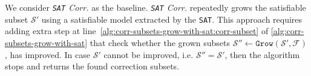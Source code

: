 \documentclass[a4paper,UKenglish,cleveref, autoref, thm-restate, pdfa]{lipics-v2021}
\newcommand\m[1]{\mathcal{#1}}
\renewcommand\comment[1]{}
\newcommand{\emilio}[1]{{\comment{\color{red}Emilio: #1}}}
\newcommand\formula{\ensuremath{\m{F} }\xspace}
\newcommand\formulac{\ensuremath{\m{C} }\xspace}
\newcommand\mm[1]{\ensuremath{#1}\xspace}
\newcommand\call[1]{\mm{\texttt{#1}}}
\newcommand\sat{\texttt{{SAT}}\xspace}
\newcommand\grow{\mm{\call{Grow}}}
\begin{document}
	We consider \emph{\sat Corr.} as the baseline. \emph{\sat Corr.} repeatedly grows the satisfiable subset $\m{S}'$ using a satisfiable model extracted by the \sat. 
	This approach requires adding extra step at line~\ref{alg:corr-subsets-grow-with-sat:corr-subset} of \cref{alg:corr-subsets-grow-with-sat} that check whether the grown subsets $\m{S}'' \gets \grow (\m{S}', \formula)$, has improved. 
	In case $\m{S}'$ cannot be improved, i.e. $\m{S}'' = \m{S}'$, then the algorithm stops and returns the found correction subsets. \emilio{todo: \begin{inparaenum}[(i)]
			\item add result to experiment
			\item Change description and remvoe check
	\end{inparaenum}}
	
	
\end{document}
